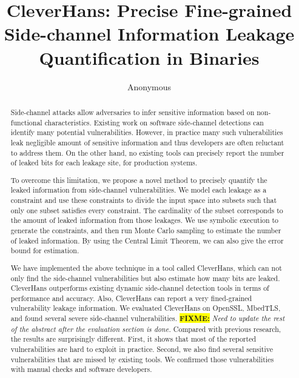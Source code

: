 \documentclass[conference]{IEEEtran}
\newcommand{\highlight}[1]{\colorbox{yellow}{\textbf{#1}}}
\newcommand{\fixme}[1]{\highlight{FIXME:} \emph{#1}}
\newcommand{\tool}{TANA}
\renewcommand{\tool}{CleverHans}
\begin{document}
\title{\tool{}: Precise Fine-grained Side-channel Information Leakage Quantification in Binaries}
\author{Anonymous}

\maketitle

\begin{abstract}
Side-channel attacks allow adversaries to infer sensitive information
based on non-functional characteristics.  Existing work on
software  side-channel detections can identify many potential
vulnerabilities.  %
However, in practice many such vulnerabilities leak negligible amount of sensitive information
and thus developers are often reluctant to address them. 
On the other hand,
no existing tools can precisely report the number of leaked
bits for each leakage site, for production systems.

To overcome this limitation, we propose a novel method to precisely
quantify the leaked information from side-channel vulnerabilities.  We
model each leakage as a constraint and use these constraints to
divide the input space into subsets such that  %
only one subset satisfies every constraint.  %
The cardinality of the subset corresponds to the amount of leaked
information from those leakages.
We use symbolic execution to
generate the constraints, 
and then run Monte Carlo sampling to estimate the number of
leaked information.  %
By using   %
the Central Limit Theorem, we can also give the error bound for
estimation.

We have implemented the above technique in a tool called \tool{},
which can not only find the side-channel vulnerabilities but also
estimate how many bits are leaked.  \tool{} outperforms existing
dynamic side-channel detection tools in terms of performance and
accuracy. Also, \tool{} can report a very fined-grained vulnerability
leakage information. 
 We evaluated 
\tool{} on OpenSSL, MbedTLS, and found several severe side-channel
vulnerabilities.
\fixme{Need to update the rest of the abstract after the evaluation section is done.}
Compared with previous research, the results are
surprisingly different.  First, it shows that most of the reported
vulnerabilities are hard to exploit in practice.  Second, we also find
several sensitive vulnerabilities that are missed by existing tools.
We confirmed those vulnerabilities with manual checks and software
developers.

\end{abstract}
\end{document}
